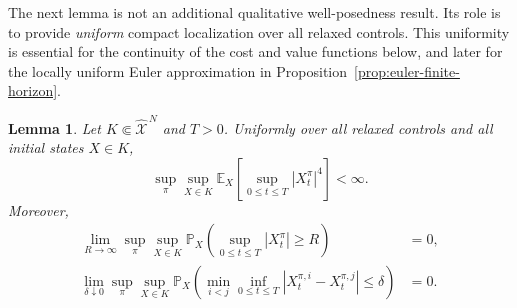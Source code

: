 \documentclass[11pt]{article}
\def\E{\mathbb{E}}
\def\P{\mathbb{P}}
\def\Xc{{\mathcal X}}
\def\hX{\widehat{\Xc}^{\,N}}
\newtheorem{lemma}[theorem]{Lemma}
\theoremstyle{definition}
\theoremstyle{remark}
\numberwithin{equation}{section}
\begin{document}
The next lemma is not an additional qualitative well-posedness result.  Its role is to provide
\emph{uniform} compact localization over all relaxed controls.  This uniformity is essential for
the continuity of the cost and value functions below, and later for the locally uniform Euler
approximation in Proposition~\ref{prop:euler-finite-horizon}.
\begin{lemma}\label{lem:uniform-localization-control}
Let $K\Subset\hX$ and $T>0$.  Uniformly over all relaxed controls and all initial states $X\in K$,
\begin{equation}\label{eq:uniform-fourth-moment-control}
 \sup_{\pi}\sup_{X\in K}
 \E_X\left[\sup_{0\le t\le T}|X_t^\pi|^4\right]<\infty.
\end{equation}
Moreover,
\begin{align}
 \lim_{R\to\infty}\sup_{\pi}\sup_{X\in K}
 \P_X\left(\sup_{0\le t\le T}|X_t^\pi|\ge R\right)&=0,
 \label{eq:uniform-no-escape-control}\\
 \lim_{\delta\downarrow0}\sup_{\pi}\sup_{X\in K}
 \P_X\left(\min_{i<j}\inf_{0\le t\le T}
 |X_t^{\pi,i}-X_t^{\pi,j}|\le\delta\right)&=0.
 \label{eq:uniform-no-near-collision-control}
\end{align}
\end{lemma}
\end{document}
